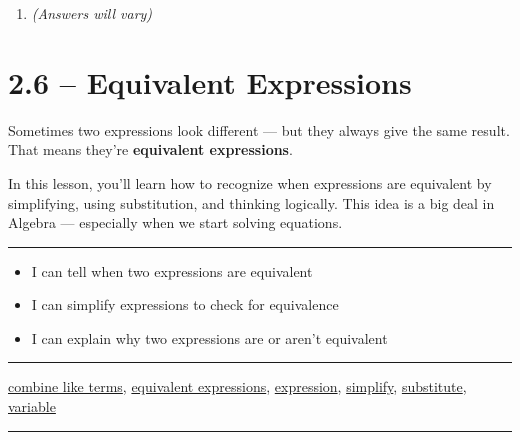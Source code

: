 \documentclass[
  letterpaper,
  DIV=11,
  numbers=noendperiod]{scrreprt}
\providecommand{\tightlist}{%
  \setlength{\itemsep}{0pt}\setlength{\parskip}{0pt}}
\begin{document}
\begin{enumerate}
\def\labelenumi{\arabic{enumi}.}
\setcounter{enumi}{3}
\tightlist
\item
  \emph{(Answers will vary)}
\end{enumerate}

\chapter*{2.6 -- Equivalent Expressions}\label{equivalent-expressions-1}


Sometimes two expressions look different --- but they always give the
same result. That means they're \textbf{equivalent expressions}.

In this lesson, you'll learn how to recognize when expressions are
equivalent by simplifying, using substitution, and thinking logically.
This idea is a big deal in Algebra --- especially when we start solving
equations.

\begin{center}\rule{0.5\linewidth}{0.5pt}\end{center}

\begin{itemize}
\tightlist
\item
  I can tell when two expressions are equivalent\\
\item
  I can simplify expressions to check for equivalence\\
\item
  I can explain why two expressions are or aren't equivalent\\
\end{itemize}

\begin{center}\rule{0.5\linewidth}{0.5pt}\end{center}

\href{./glossary.html\#glossary-combine-like-term}{combine like terms},
\href{./glossary.html\#glossary-equivalent-expression}{equivalent expressions},
\href{./glossary.html\#glossary-expression}{expression},
\href{./glossary.html\#glossary-simplify}{simplify},
\href{./glossary.html\#glossary-substitute}{substitute},
\href{./glossary.html\#glossary-variable}{variable}

\begin{center}\rule{0.5\linewidth}{0.5pt}\end{center}
\end{document}
